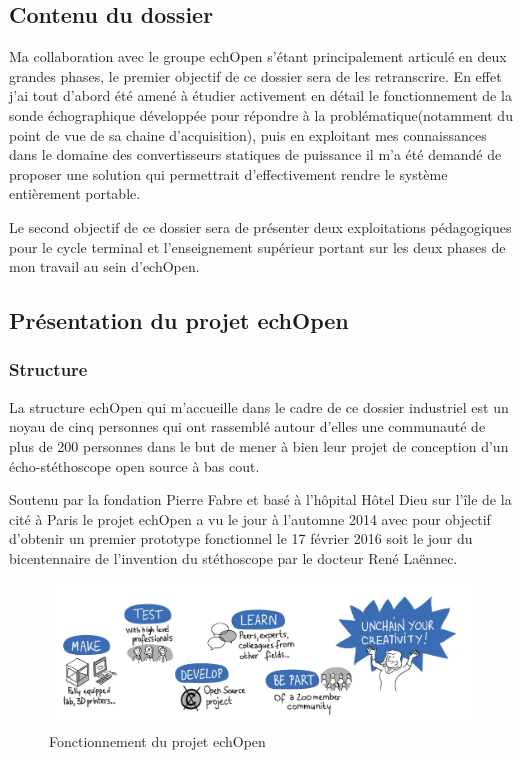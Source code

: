 \documentclass[12pt]{article}
\begin{document}
\par
\vspace{10pt}

\subsection{Contenu du dossier}

Ma collaboration avec le groupe echOpen s'étant principalement articulé en deux grandes phases, le premier objectif de ce dossier sera de les retranscrire. En effet  j'ai tout d'abord été amené à étudier activement en détail le fonctionnement de la sonde échographique développée pour répondre à la problématique(notamment du point de vue de sa chaine d'acquisition), puis en exploitant mes connaissances dans le domaine des convertisseurs statiques de puissance il m'a été demandé de proposer une solution qui permettrait d'effectivement rendre le système entièrement portable.\par
Le second objectif de ce dossier sera de présenter deux exploitations pédagogiques pour le cycle terminal et l'enseignement supérieur portant sur les deux phases de mon travail au sein d'echOpen. 


\newpage

\subsection{Présentation du projet echOpen}
\subsubsection{Structure}

La structure echOpen \cite{echopen} qui m'accueille dans le cadre de ce dossier industriel est un noyau de cinq personnes qui ont rassemblé autour d'elles une communauté de plus de 200 personnes dans le but de mener à bien leur projet de conception d'un écho-stéthoscope open source à bas cout.\par
Soutenu par la fondation Pierre Fabre et basé à l'hôpital Hôtel Dieu sur l'île de la cité à Paris le projet echOpen a vu le jour à l'automne 2014 avec pour objectif d'obtenir un premier prototype fonctionnel le 17 février 2016 soit le jour du bicentennaire de l'invention du stéthoscope par le docteur René Laënnec. \par
\vspace{10pt}

\begin{figure}[h!]
\centering
\includegraphics[scale=.29]{Images_Rapport/fonctionnement_echopen} 
\caption{Fonctionnement du projet echOpen}
\end{figure}
\end{document}
